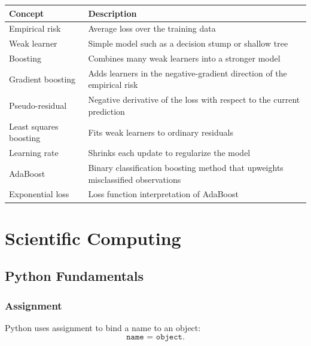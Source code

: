 \documentclass[12pt,oneside]{book}
\numberwithin{equation}{section}
\theoremstyle{definition}
\theoremstyle{plain}
\theoremstyle{remark}
\begin{document}
\begin{center}
\begin{xltabular}{\textwidth}{>{\raggedright\arraybackslash}p{0.28\textwidth}
>{\raggedright\arraybackslash}X}
\toprule
Concept & Description \\
\midrule
Empirical risk
& Average loss over the training data \\

Weak learner
& Simple model such as a decision stump or shallow tree \\

Boosting
& Combines many weak learners into a stronger model \\

Gradient boosting
& Adds learners in the negative-gradient direction of the empirical risk \\

Pseudo-residual
& Negative derivative of the loss with respect to the current prediction \\

Least squares boosting
& Fits weak learners to ordinary residuals \\

Learning rate
& Shrinks each update to regularize the model \\

AdaBoost
& Binary classification boosting method that upweights misclassified observations \\

Exponential loss
& Loss function interpretation of AdaBoost \\
\bottomrule
\end{xltabular}
\end{center}

\part{Scientific Computing}

\chapter{Python Fundamentals}

\section{Assignment}

Python uses assignment to bind a name to an object:
\[
\texttt{name = object}.
\]
\end{document}
